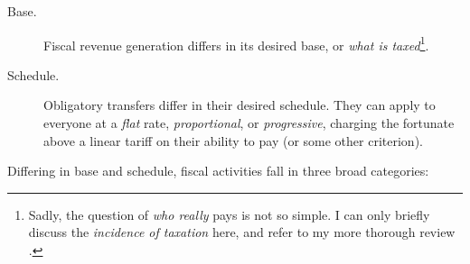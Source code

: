 \begin{description}
	\item[Base.]  \label{it:base} Fiscal revenue generation differs in its desired base, or \emph{what is taxed}\footnote{
		Sadly, the question of \emph{who really} pays is not so simple. I can only briefly discuss the \emph{incidence of taxation} here, and refer to my more thorough review \citep{Held2010a}.}.
	\item[Schedule.]  \label{it:schedule} Obligatory transfers differ in their desired schedule. They can apply to everyone at a \emph{flat} rate, \emph{proportional}, or \emph{progressive}, charging the fortunate above a linear tariff on their ability to pay (or some other criterion).
\end{description}



Differing in base and schedule, fiscal activities fall in three broad categories:

